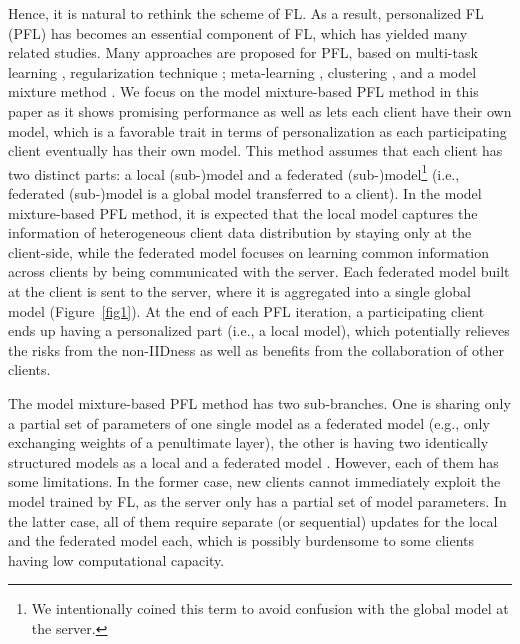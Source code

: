 \documentclass[sigconf]{acmart}
\begin{document}
Hence, it is natural to rethink the scheme of FL. As a result, personalized FL (PFL) has becomes an essential component of FL, which has yielded many related studies. Many approaches are proposed for PFL, based on multi-task learning \cite{mocha, mar+21, fedu}, regularization technique \cite{l2sgd, pfedme, ditto}; meta-learning  \cite{Fallah, jiang+19}, clustering \cite{ghosh+20, clustered, mansour+20}, and a model mixture method \cite{fedrep, FedPer, lgfedavg, ditto, apfl, mansour+20}. We focus on the model mixture-based PFL method in this paper as it shows promising performance as well as lets each client have their own model, which is a favorable trait in terms of personalization as each participating client eventually has their own model. This method assumes that each client has two distinct parts: a local (sub-)model and a federated (sub-)model\footnote{We intentionally coined this term to avoid confusion with the global model at the server.} (i.e., federated (sub-)model is a global model transferred to a client). In the model mixture-based PFL method, it is expected that the local model captures the information of heterogeneous client data distribution by staying only at the client-side, while the federated model focuses on learning common information across clients by being communicated with the server. Each federated model built at the client is sent to the server, where it is aggregated into a single global model (Figure~\ref{fig1}). At the end of each PFL iteration, a participating client ends up having a personalized part (i.e., a local model), which potentially relieves the risks from the non-IIDness as well as benefits from the collaboration of other clients.

The model mixture-based PFL method has two sub-branches. One is sharing only a partial set of parameters of one single model as a federated model \cite{fedrep, FedPer, lgfedavg} (e.g., only exchanging weights of a penultimate layer), the other is having two identically structured models as a local and a federated model \cite{ditto, apfl, l2sgd, pfedme, mansour+20}. However, each of them has some limitations. In the former case, new clients cannot immediately exploit the model trained by FL, as the server only has a partial set of model parameters. In the latter case, all of them require separate (or sequential) updates for the local and the federated model each, which is possibly burdensome to some clients having low computational capacity.
\end{document}
